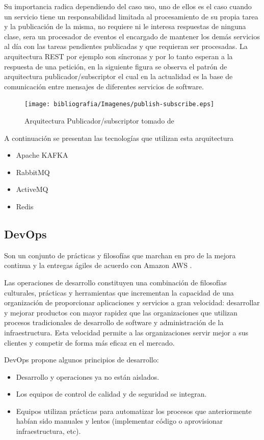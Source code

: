 Su importancia radica dependiendo del caso uso, uno de ellos es el caso cuando un servicio tiene un responsabilidad limitada al procesamiento de su propia tarea y la publicación de la misma, no requiere ni le interesa respuestas de ninguna clase, sera un procesador de eventos el encargado de mantener los demás servicios al día con las tareas pendientes publicadas y que requieran ser procesadas. La arquitectura REST por ejemplo son síncronas y por lo tanto esperan a la respuesta de una petición, en la siguiente figura se observa el patrón de arquitectura publicador/subscriptor el cual en la actualidad es la base de comunicación entre mensajes de diferentes servicios de software.

\begin{figure}[H]
    \centering
    \texttt{[image: bibliografia/Imagenes/publish-subscribe.eps]}
    \caption{Arquitectura Publicador/subscriptor tomado de \cite{microsftPub/Sub}}
\end{figure}

A continuación se presentan las tecnologías que utilizan esta arquitectura
\begin{itemize}
    \item Apache KAFKA
    \item RabbitMQ
    \item ActiveMQ
    \item Redis
\end{itemize}

\subsection{DevOps}

Son un conjunto de prácticas y filosofías que marchan en pro de la mejora continua y la entregas ágiles de acuerdo con Amazon AWS \cite{awsDevOps}. 

Las operaciones de desarrollo constituyen una combinación de filosofías culturales, prácticas y herramientas que incrementan la capacidad de una organización de proporcionar aplicaciones y servicios a gran velocidad: desarrollar y mejorar productos con mayor rapidez que las organizaciones que utilizan procesos tradicionales de desarrollo de software y administración de la infraestructura. Esta velocidad permite a las organizaciones servir mejor a sus clientes y competir de forma más eficaz en el mercado.

DevOps propone algunos principios de desarrollo: 

\begin{itemize}
    \item Desarrollo y operaciones ya no están aislados.
    \item Los equipos de control de calidad y de seguridad se integran.
    \item Equipos utilizan prácticas para automatizar los procesos que anteriormente habían sido manuales y lentos (implementar código o aprovisionar infraestructura, etc).
\end{itemize}

